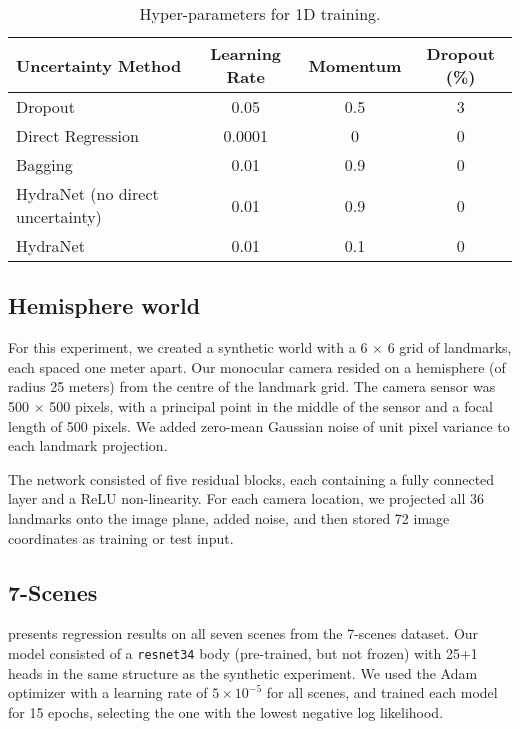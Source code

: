 \begin{table*}[]
	\centering
	\caption{Hyper-parameters for 1D training.}
	\begin{threeparttable}
	\begin{tabular}{lccc}
		\toprule
		\textbf{Uncertainty Method} & \textbf{Learning Rate} & \textbf{Momentum} & \textbf{Dropout (\%)} \\ \midrule
		Dropout & 0.05 & 0.5 & 3 \\
		Direct Regression & 0.0001 & 0 & 0 \\
		Bagging & 0.01 & 0.9 & 0 \\
		HydraNet (no direct uncertainty) & 0.01 & 0.9 & 0 \\
		HydraNet & 0.01 & 0.1 & 0 \\ \bottomrule
	\end{tabular}
	\label{tab:1d-hyp}
\end{threeparttable}
\end{table*}


\subsection{Hemisphere world}

For this experiment, we created a synthetic world with a 6 $\times$ 6 grid of landmarks, each spaced one meter apart. Our monocular camera resided on a hemisphere (of radius 25 meters) from the centre of the landmark grid. The camera sensor was 500 $\times$ 500 pixels, with a principal point in the middle of the sensor and a focal length of 500 pixels.  We added zero-mean Gaussian noise of unit pixel variance to each landmark projection. 

The network consisted of five residual blocks, each containing a fully connected layer and a ReLU non-linearity. For each camera location, we projected all 36 landmarks onto the image plane, added noise, and then stored 72 image coordinates as training or test input. 

\subsection{7-Scenes}

 presents regression results on all seven scenes from the 7-scenes dataset. Our model consisted of a \texttt{resnet34} body (pre-trained, but not frozen) with 25+1 heads in the same structure as the synthetic experiment. We used the Adam optimizer with a learning rate of $5 \times 10^{-5}$ for all scenes, and trained each model for 15 epochs, selecting the one with the lowest negative log likelihood.

